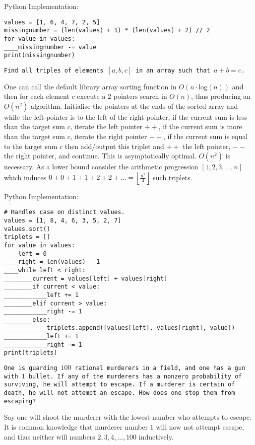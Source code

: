Python Implementation:

\begin{verbatim}
values = [1, 6, 4, 7, 2, 5]
missingnumber = (len(values) + 1) * (len(values) + 2) // 2
for value in values:
____missingnumber -= value
print(missingnumber)
\end{verbatim}

\texttt{Find all triples of elements $[a,b,c]$ in an array such that $a+b=c$.}

One can call the default library array sorting function in $O(n \cdot \text{log}(n))$ and then for each element $c$ execute a $2$ pointers search in $O(n)$, thus producing an $O(n^2)$ algorithm. Initialise the pointers at the ends of the sorted array and while the left pointer is to the left of the right pointer, if the current sum is less than the target sum $c$, iterate the left pointer $++$, if the current sum is more than the target sum $c$, iterate the right pointer $--$, if the current sum is equal to the target sum $c$ then add/output this triplet and $++$ the left pointer, $--$ the right pointer, and continue. This is asymptotically optimal. $O(n^2)$ is necessary. As a lower bound consider the arithmetic progression $[1,2,3,...,n]$ which induces $0+0+1+1+2+2+\dots = \left \lfloor \frac{n^2}{4} \right \rfloor$ such triplets.

Python Implementation:

\begin{verbatim}
# Handles case on distinct values.
values = [1, 8, 4, 6, 3, 5, 2, 7]
values.sort()
triplets = []
for value in values:
____left = 0
____right = len(values) - 1
____while left < right:
________current = values[left] + values[right]
________if current < value:
____________left += 1
________elif current > value:
____________right -= 1
________else:
____________triplets.append([values[left], values[right], value])
____________left += 1
____________right -= 1
print(triplets)
\end{verbatim}

\texttt{One is guarding $100$ rational murderers in a field, and one has a gun with $1$ bullet. If any of the murderers has a nonzero probability of surviving, he will attempt to escape. If a murderer is certain of death, he will not attempt an escape. How does one stop them from escaping?}

Say one will shoot the murderer with the lowest number who attempts to escape. It is common knowledge that murderer number $1$ will now not attempt escape, and thus neither will numbers $2,3,4,\dots,100$ inductively.

